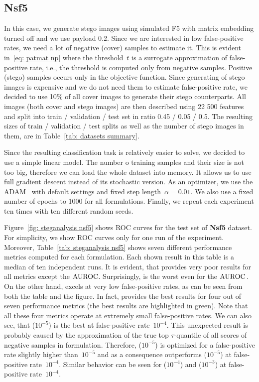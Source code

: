 \subsection{Nsf5}

In this case, we generate stego images using simulated F5 with matrix embedding turned off and we use payload 0.2. Since we are interested in low false-positive rates, we need a lot of negative (cover) samples to estimate it. This is evident in~\eqref{eq: patmat np} where the threshold~$t$ is a surrogate approximation of false-positive rate, i.e., the threshold is computed only from negative samples. Positive (stego) samples occurs only in the objective function. Since generating of stego images is expensive and we do not need them to estimate false-positive rate, we decided to use 10\% of all cover images to generate their stego counterparts. All images (both cover and stego images) are then described using 22 500 features and split into train / validation / test set in ratio 0.45 / 0.05 / 0.5. The resulting sizes of train / validation / test splits as well as the number of stego images in them, are in Table~\ref{tab: datasets summary}. 

Since the resulting classification task is relatively easier to solve, we decided to use a simple linear model. The number o training samples and their size is not too big, therefore we can load the whole dataset into memory. It allows us to use full gradient descent instead of its stochastic version. As an optimizer, we use the ADAM~\cite{kingma2014adam} with default settings and fixed step length~$\alpha = 0.01.$ We also use a fixed number of epochs to 1000 for all formulations. Finally, we repeat each experiment ten times with ten different random seeds.

Figure~\ref{fig: steganalysis nsf5} shows ROC curves for the test set of \textbf{Nsf5} dataset. For simplicity, we show ROC curves only for one run of the experiment. Moreover, Table~\ref{tab: steganalysis nsf5} shows seven different performance metrics computed for each formulation. Each shown result in this table is a median of ten independent runs. It is evident, that \BaseLine provides very poor results for all metrics except the $\operatorname{AUROC}$. Surprisingly, \BaseLine is the worst even for the $\operatorname{AUROC}.$ On the other hand, \DeepTopPush excels at very low false-positive rates, as can be seen from both the table and the figure. In fact, \DeepTopPush provides the best results for four out of seven performance metrics (the best results are highlighted in green). Note that all these four metrics operate at extremely small false-positive rates. We can also see, that \PatMatNP($10^{-5}$) is the best at false-positive rate~$10^{-4}$. This unexpected result is probably caused by the approximation of the true top $\tau$-quantile of all scores of negative samples in \PatMatNP formulation. Therefore, \PatMatNP($10^{-5}$) is optimized for a false-positive rate slightly higher than~$10^{-5}$ and as a consequence outperforms \PatMatNP($10^{-5}$) at false-positive rate~$10^{-4}$. Similar behavior can be seen for \PatMatNP($10^{-4}$) and \PatMatNP($10^{-3}$) at false-positive rate~$10^{-4}$.

